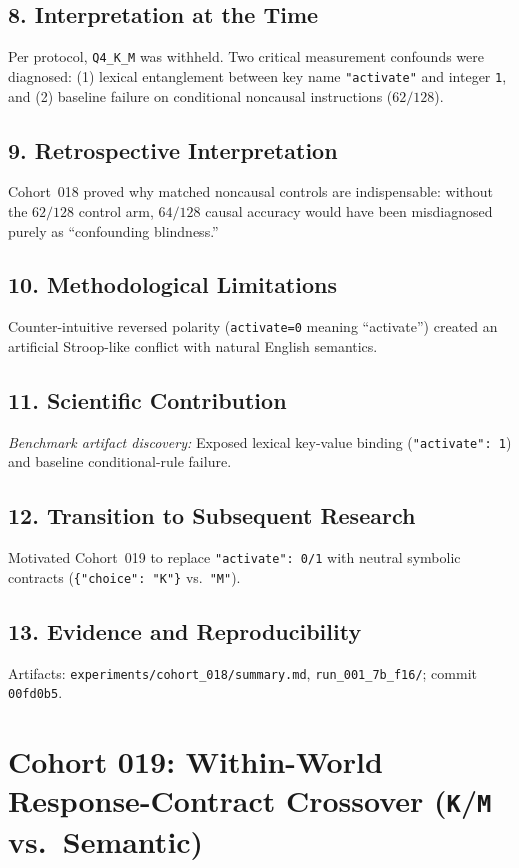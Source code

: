\subsection*{8. Interpretation at the Time}
Per protocol, \texttt{Q4\_K\_M} was withheld. Two critical measurement confounds were diagnosed: (1) lexical entanglement between key name \texttt{"activate"} and integer \texttt{1}, and (2) baseline failure on conditional noncausal instructions ($62/128$).

\subsection*{9. Retrospective Interpretation}
Cohort~018 proved why matched noncausal controls are indispensable: without the $62/128$ control arm, $64/128$ causal accuracy would have been misdiagnosed purely as ``confounding blindness.''

\subsection*{10. Methodological Limitations}
Counter-intuitive reversed polarity (\texttt{activate=0} meaning ``activate'') created an artificial Stroop-like conflict with natural English semantics.

\subsection*{11. Scientific Contribution}
\emph{Benchmark artifact discovery:} Exposed lexical key-value binding (\texttt{"activate": 1}) and baseline conditional-rule failure.

\subsection*{12. Transition to Subsequent Research}
Motivated Cohort~019 to replace \texttt{"activate": 0/1} with neutral symbolic contracts (\texttt{\{"choice": "K"\}} vs.\ \texttt{"M"}).

\subsection*{13. Evidence and Reproducibility}
Artifacts: \texttt{experiments/cohort\_018/summary.md}, \texttt{run\_001\_7b\_f16/}; commit \texttt{00fd0b5}.

\section{Cohort 019: Within-World Response-Contract Crossover (\texttt{K}/\texttt{M} vs.\ Semantic)}

